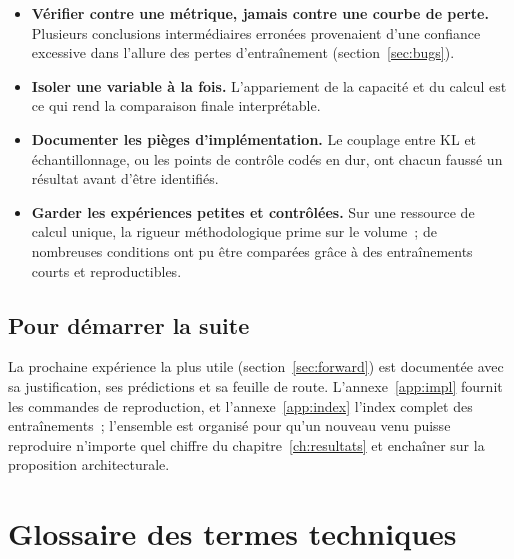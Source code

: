 \documentclass[12pt,a4paper,oneside]{report}
\theoremstyle{definition}
\theoremstyle{plain}
\begin{document}
\begin{itemize}[leftmargin=*]
\item \textbf{Vérifier contre une métrique, jamais contre une courbe de perte.}
Plusieurs conclusions intermédiaires erronées provenaient d'une confiance excessive
dans l'allure des pertes d'entraînement (section~\ref{sec:bugs}).
\item \textbf{Isoler une variable à la fois.} L'appariement de la capacité et du
calcul est ce qui rend la comparaison finale interprétable.
\item \textbf{Documenter les pièges d'implémentation.} Le couplage entre KL et
échantillonnage, ou les points de contrôle codés en dur, ont chacun faussé un
résultat avant d'être identifiés.
\item \textbf{Garder les expériences petites et contrôlées.} Sur une ressource de
calcul unique, la rigueur méthodologique prime sur le volume~; de nombreuses
conditions ont pu être comparées grâce à des entraînements courts et reproductibles.
\end{itemize}

\section{Pour démarrer la suite}

La prochaine expérience la plus utile (section~\ref{sec:forward}) est documentée
avec sa justification, ses prédictions et sa feuille de route. L'annexe~\ref{app:impl}
fournit les commandes de reproduction, et l'annexe~\ref{app:index} l'index complet
des entraînements~; l'ensemble est organisé pour qu'un nouveau venu puisse reproduire
n'importe quel chiffre du chapitre~\ref{ch:resultats} et enchaîner sur la proposition
architecturale.

\chapter{Glossaire des termes techniques}
\label{app:glossaire}
\end{document}
